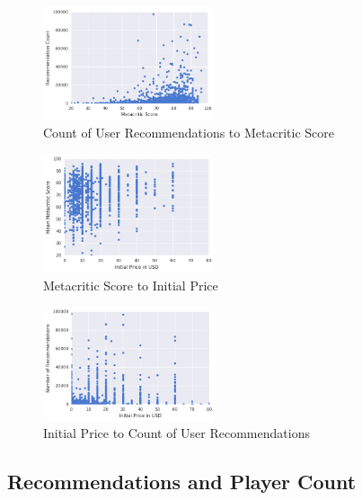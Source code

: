 \documentclass[letterpaper,10pt,twocolumn]{article}
\begin{document}

\begin{figure}[h]
    \caption{Count of User Recommendations to Metacritic Score \label{fig:metacritic-recommendations}}
    \includegraphics[width=0.45\textwidth,keepaspectratio]{metacritic-recommendations-scatter}
\end{figure}

\begin{figure}[h]
    \caption{Metacritic Score to Initial Price \label{fig:metacritic-price}}
    \includegraphics[width=0.45\textwidth,keepaspectratio]{price-metacritic-scatter}
\end{figure}

\begin{figure}[h]
    \caption{Initial Price to Count of User Recommendations \label{fig:price-recommendations}}
    \includegraphics[width=0.45\textwidth,keepaspectratio]{price-recommendations-scatter}
\end{figure}

\subsection{Recommendations and Player Count}
\end{document}
